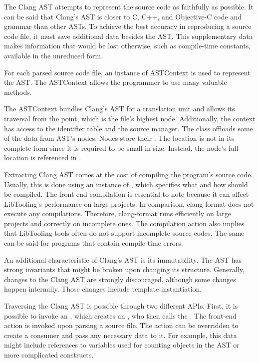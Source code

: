 The Clang AST attempts to represent the source code as faithfully 
as possible. 
It can be said that Clang's AST is closer to C, C++, 
and Objective-C code and grammar than other ASTs. 
To achieve the best accuracy in reproducing a source code file, 
it must save additional data besides the AST. 
This supplementary data makes information that would be lost 
otherwise, such as compile-time constants, available 
in the unreduced form. 

For each parsed source code file, an instance of ASTContext 
is used to represent the AST. 
The ASTContext allows the programmer to use many valuable methods. 


The ASTContext bundles Clang's AST for a translation unit 
and allows its traversal from the 
point, which is the file's highest node. 
Additionally, the context has access to the identifier table 
and the source manager. 
The  class offloads some of the data 
from AST's nodes. 
Nodes store their . 
The location is not in its complete form since it is required 
to be small in size. 
Instead, the node's full location is referenced 
in .

Extracting Clang AST comes at the cost of compiling the program's
source code. 
Usually, this is done using an instance of , 
which specifies what and how should be compiled. 
The front-end compilation is essential to note because it can affect 
LibTooling's performance on large projects. 
In comparison, clang-format does not execute any compilations. 
Therefore, clang-format runs efficiently on large projects 
and correctly on incomplete ones. 
The compilation action also implies that LibTooling tools often 
do not support incomplete source codes. 
The same can be said for programs that contain compile-time errors.

An additional characteristic of Clang's AST is its immutability. 
The AST has strong invariants that might be broken upon changing 
its structure. 
Generally, changes to the Clang AST are strongly discouraged, 
although some changes happen internally. 
Those changes include template instantiation.

Traversing the Clang AST is possible through two different APIs. 
First, it is possible to invoke an , which 
creates an , who then calls 
the . 
The front-end action is invoked upon parsing a source file. 
The action can be overridden to create a consumer and pass any necessary 
data to it. 
For example, this data might include references to variables used for 
counting objects in the AST or more complicated constructs. 


